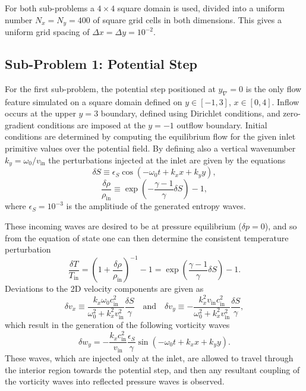 For both sub-problems a $4\times4$ square domain is used, divided into a uniform number $N_x=N_y=400$ of square grid cells in both dimensions. This gives a uniform grid spacing of $\Delta x=\Delta y=10^{-2}$.

\subsection{Sub-Problem 1: Potential Step}
\label{subsec:sub_problem_1}

For the first sub-problem, the potential step positioned at $y_\nabla=0$ is the only flow feature simulated on a square domain defined on $y\in[-1,3]$, $x\in[0,4]$. Inflow occurs at the upper $y=3$ boundary, defined using Dirichlet conditions, and zero-gradient conditions are imposed at the $y=-1$ outflow boundary. Initial conditions are determined by computing the equilibrium flow for the given inlet primitive values over the potential field. By defining also a vertical wavenumber $k_y=\omega_0/v_\textrm{in}$ the perturbations injected at the inlet are given by the equations
\begin{equation}
\delta S\equiv\epsilon_S\cos\left(-\omega_0t+k_xx+k_yy\right),
\end{equation}
\begin{equation}
\frac{\delta \rho}{\rho_\textrm{in}}\equiv\exp\left(-\frac{\gamma-1}{\gamma}\delta S\right)-1,
\end{equation}
where $\epsilon_S=10^{-3}$ is the amplitiude of the generated entropy waves.

These incoming waves are desired to be at pressure equilibrium ($\delta p=0$), and so from the equation of state one can then determine the consistent temperature perturbation
\begin{equation}
\frac{\delta T}{T_\textrm{in}}=\left(1+\frac{\delta\rho}{\rho_\textrm{in}}\right)^{-1}-1=\exp\left(\frac{\gamma-1}{\gamma}\delta S\right)-1.
\end{equation}
Deviations to the 2D velocity components are given as
\begin{equation}
\delta v_x\equiv\frac{k_x\omega_0c_\textrm{in}^2}{\omega_0^2+k_x^2v_\textrm{in}^2}\frac{\delta S}{\gamma} \quad \textrm{and} \quad \delta v_y\equiv-\frac{k_x^2v_\textrm{in}c_\textrm{in}^2}{\omega_0^2+k_x^2v_\textrm{in}^2}\frac{\delta S}{\gamma},
\end{equation}
which result in the generation of the following vorticity waves 
\begin{equation}
\delta w_y=-\frac{k_xc_\textrm{in}^2}{v_\textrm{in}}\frac{\epsilon_S}{\gamma}\sin\left(-\omega_0t+k_xx+k_yy\right).
\end{equation}
These waves, which are injected only at the inlet, are allowed to travel through the interior region towards the potential step, and then any resultant coupling of the vorticity waves into reflected pressure waves is observed.

